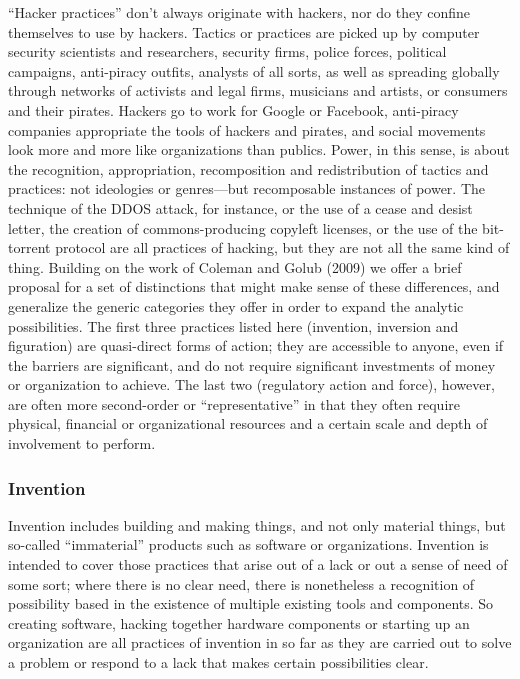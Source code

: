 \documentclass[10pt,letter,oneside]{scrartcl}
\begin{document}
``Hacker practices'' don’t always originate with hackers, nor do they confine themselves to use by hackers. Tactics or practices are picked up by computer security scientists and researchers, security firms, police forces, political campaigns, anti-piracy outfits, analysts of all sorts, as well as spreading globally through networks of activists and legal firms, musicians and artists, or consumers and their pirates. Hackers go to work for Google or Facebook, anti-piracy companies appropriate the tools of hackers and pirates, and social movements look more and more like organizations than publics.  Power, in this sense, is about the recognition, appropriation, recomposition and redistribution of tactics and practices: not ideologies or genres—but recomposable instances of power.  The technique of the DDOS attack, for instance, or the use of a cease and desist letter, the creation of commons-producing copyleft licenses, or the use of the bit-torrent protocol are all practices of hacking, but they are not all the same kind of thing.  Building on the work of Coleman and Golub (2009) we offer a brief proposal for a set of distinctions that might make sense of these differences, and generalize the generic categories they offer in order to expand the analytic possibilities.  The first three practices listed here (invention, inversion and figuration) are quasi-direct forms of action; they are accessible to anyone, even if the barriers are significant, and do not require significant investments of money or organization to achieve.  The last two (regulatory action and force), however, are often more second-order or ``representative'' in that they often require physical, financial or organizational resources and a certain scale and depth of involvement to perform. 

\subsubsection{Invention}

Invention includes building and making things, and not only material things, but so-called ``immaterial'' products such as software or organizations.  Invention is intended to cover those practices that arise out of a lack or out a sense of need of some sort; where there is no clear need, there is nonetheless a recognition of possibility based in the existence of multiple existing tools and components.  So creating software, hacking together hardware components or starting up an organization are all practices of invention in so far as they are carried out to solve a problem or respond to a lack that makes certain possibilities clear.  
\end{document}
